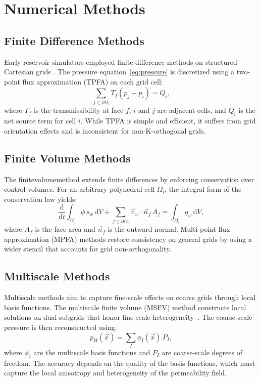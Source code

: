 \section{Numerical Methods}
\label{sec:background:methods}

\subsection{Finite Difference Methods}
\label{ssec:background:fdm}

Early reservoir simulators employed finite difference methods on structured Cartesian grids \cite{knuthFundamentalAlgorithms1973}. The pressure equation~\eqref{eq:pressure} is discretized using a two-point flux approximation (TPFA) on each grid cell:
\begin{equation}
    \sum_{f \in \partial \Omega_i} T_f \left( p_j - p_i \right) = Q_i,
    \label{eq:tpfa}
\end{equation}
where $T_f$ is the transmissibility at face $f$, $i$ and $j$ are adjacent cells, and $Q_i$ is the net source term for cell $i$. While TPFA is simple and efficient, it suffers from grid orientation effects and is inconsistent for non-K-orthogonal grids.

\subsection{Finite Volume Methods}
\label{ssec:background:fvm}

The \gls{finitevolumemethod} extends finite differences by enforcing conservation over control volumes. For an arbitrary polyhedral cell $\Omega_i$, the integral form of the conservation law yields:
\begin{equation}
    \frac{\mathrm{d}}{\mathrm{d}t} \int_{\Omega_i} \phi \, s_w \, \mathrm{d}V + \sum_{f \in \partial \Omega_i} \vec{v}_w \cdot \vec{n}_f \, A_f = \int_{\Omega_i} q_w \, \mathrm{d}V,
    \label{eq:fvm}
\end{equation}
where $A_f$ is the face area and $\vec{n}_f$ is the outward normal. Multi-point flux approximation (MPFA) methods restore consistency on general grids by using a wider stencil that accounts for grid non-orthogonality.

\subsection{Multiscale Methods}
\label{ssec:background:multiscale}

Multiscale methods aim to capture fine-scale effects on coarse grids through local basis functions. The multiscale finite volume (MSFV) method constructs local solutions on dual subgrids that honor fine-scale heterogeneity~\cite{mckinneyPythonDataAnalysis2018}. The coarse-scale pressure is then reconstructed using:
\begin{equation}
    p_H(\vec{x}) = \sum_{I} \phi_I(\vec{x}) \, P_I,
    \label{eq:msfv}
\end{equation}
where $\phi_I$ are the multiscale basis functions and $P_I$ are coarse-scale degrees of freedom. The accuracy depends on the quality of the basis functions, which must capture the local anisotropy and heterogeneity of the permeability field.


